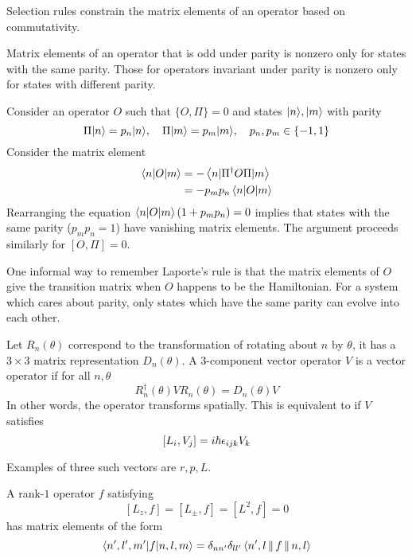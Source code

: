 Selection rules constrain the matrix elements of an operator based on commutativity. 
\begin{theorem}
    Matrix elements of an operator that is odd under parity is nonzero only 
    for states with the same parity. Those for operators invariant under parity 
    is nonzero only for states with different parity. 
    
    \prf Consider an operator $O$ such that $\{O, \Pi\}=0$ and states $|n\rangle, |m\rangle$ with 
    parity 
    \[ 
        \Pi |n\rangle = p_n|n\rangle, \quad \Pi |m\rangle = p_m|m\rangle, \quad p_n, p_m\in \{-1, 1\} 
    \] 
    Consider the matrix element 
    \[ \begin{aligned}
        \left\langle n|O|m \right\rangle &= -\left\langle n|\Pi^\dag O \Pi|m \right\rangle \\ 
            &= -p_mp_n \left\langle n|O|m \right\rangle
    \end{aligned}\] 
    Rearranging the equation $\left\langle n|O|m \right\rangle(1+p_mp_n) = 0$ implies that states with the same parity 
    ($p_mp_n=1$) have vanishing matrix elements. The argument proceeds similarly for $[O, \Pi] = 0$. 
\end{theorem}
\begin{remark}
    One informal way to remember Laporte's rule is that the matrix elements of $O$ give the 
    transition matrix when $O$ happens to be the Hamiltonian. For a system which 
    cares about parity, only states which have the same parity can evolve into each other. 
\end{remark}
\begin{definition}
    Let $R_n(\theta)$ correspond to the transformation of rotating about $n$ by $\theta$, 
    it has a $3\times 3$ matrix representation $D_n(\theta)$. A 3-component vector 
    operator $V$ is a vector operator if for all $n, \theta$
    \[ 
        R_n^\dag(\theta) V R_n(\theta) = D_n(\theta)V
    \] 
    In other words, the operator transforms spatially. This is equivalent to if $V$ satisfies
    \[ 
        [L_i, V_j] = i\hbar \epsilon_{ijk} V_k
    \] 
\end{definition}
Examples of three such vectors are $r, p, L$. 
\begin{theorem} 
    A rank-$1$ operator $f$ satisfying 
    \[ [L_z, f] = [L_\pm, f] = [L^2, f] = 0\]
    has matrix elements of the form 
    \[ 
        \left\langle n', l', m'|f|n, l, m \right\rangle = \delta_{nn'}\delta_{ll'}\left\langle n',l\, \|\, f\, \|\, n, l \right\rangle
    \] 
\end{theorem}